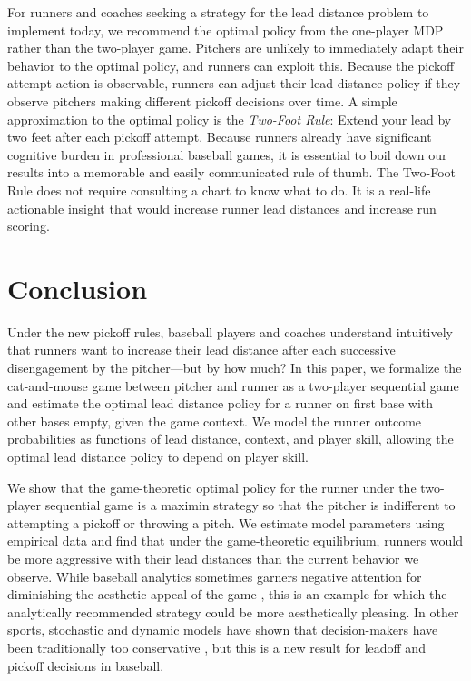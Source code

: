 \documentclass[aoas]{imsart}
\begin{document}
    For runners and coaches seeking a strategy for the lead distance problem to implement today, we recommend the optimal policy from the one-player MDP rather than the two-player game. Pitchers are unlikely to immediately adapt their behavior to the optimal policy, and runners can exploit this. Because the pickoff attempt action is observable, runners can adjust their lead distance policy if they observe pitchers making different pickoff decisions over time. A simple approximation to the optimal policy is the \textit{Two-Foot Rule}: Extend your lead by two feet after each pickoff attempt. Because runners already have significant cognitive burden in professional baseball games, it is essential to boil down our results into a memorable and easily communicated rule of thumb. The Two-Foot Rule does not require consulting a chart to know what to do. It is a real-life actionable insight that would increase runner lead distances and increase run scoring.
   
  \section{Conclusion}
  \label{sec:conclusion}

    Under the new pickoff rules, baseball players and coaches understand intuitively that runners want to increase their lead distance after each successive disengagement by the pitcher---but by how much? In this paper, we formalize the cat-and-mouse game between pitcher and runner as a two-player sequential game and estimate the optimal lead distance policy for a runner on first base with other bases empty, given the game context. We model the runner outcome probabilities as functions of lead distance, context, and player skill, allowing the optimal lead distance policy to depend on player skill.

    We show that the game-theoretic optimal policy for the runner under the two-player sequential game is a maximin strategy so that the pitcher is indifferent to attempting a pickoff or throwing a pitch. We estimate model parameters using empirical data and find that under the game-theoretic equilibrium, runners would be more aggressive with their lead distances than the current behavior we observe. While baseball analytics sometimes garners negative attention for diminishing the aesthetic appeal of the game \citep{sheinin_analytics_2025}, this is an example for which the analytically recommended strategy could be more aesthetically pleasing. In other sports, stochastic and dynamic models have shown that decision-makers have been traditionally too conservative \citep{romer_firms_2006, beaudoin_strategies_2010, yam_what_2019}, but this is a new result for leadoff and pickoff decisions in baseball.
\end{document}
